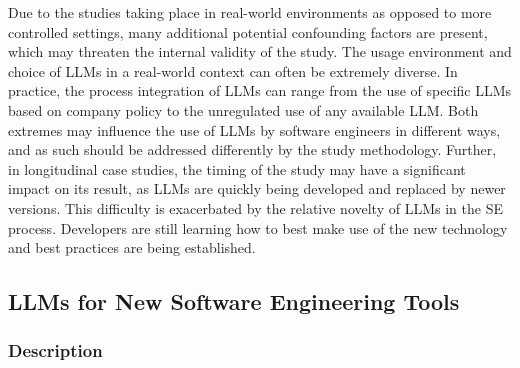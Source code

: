 Due to the studies taking place in real-world environments as opposed to more controlled settings, many additional potential confounding factors are present, which may threaten the internal validity of the study.
The usage environment and choice of LLMs in a real-world context can often be extremely diverse.
In practice, the process integration of LLMs can range from the use of specific LLMs based on company policy to the unregulated use of any available LLM. 
Both extremes may influence the use of LLMs by software engineers in different ways, and as such should be addressed differently by the study methodology.
Further, in longitudinal case studies, the timing of the study may have a significant impact on its result, as LLMs are quickly being developed and replaced by newer versions.
This difficulty is exacerbated by the relative novelty of LLMs in the SE process.
Developers are still learning how to best make use of the new technology and best practices are being established.


\subsection{LLMs for New Software Engineering Tools}

\subsubsection{Description}

